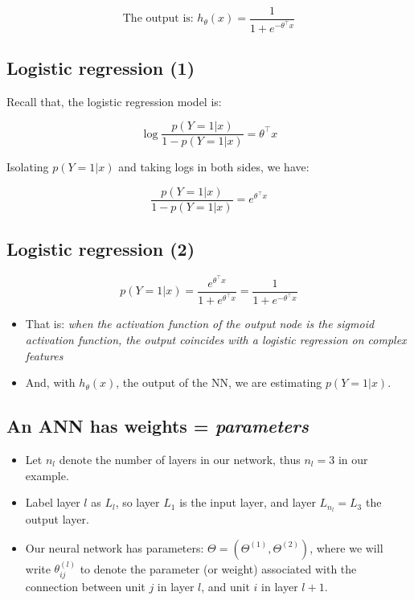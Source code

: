 \documentclass[
  letterpaper,
  DIV=11,
  numbers=noendperiod]{scrartcl}
\providecommand{\tightlist}{%
  \setlength{\itemsep}{0pt}\setlength{\parskip}{0pt}}\usepackage{longtable,booktabs,array}
\begin{document}
\[
\mbox{The output is: }h_{\theta}(x)=\frac{1}{1+e^{-\theta^\intercal x}}
\]

\hypertarget{logistic-regression-1}{%
\subsection{Logistic regression (1)}\label{logistic-regression-1}}

Recall that, the logistic regression model is:

\[
\log\frac{p(Y=1|x)}{1-p(Y=1|x)}=\theta^\intercal x
\]

Isolating \(p(Y=1|x)\) and taking logs in both sides, we have:

\[
\frac{p(Y=1|x)}{1-p(Y=1|x)}=e^{\theta^\intercal x}
\]

\hypertarget{logistic-regression-2}{%
\subsection{Logistic regression (2)}\label{logistic-regression-2}}

\[
p(Y=1|x)=\frac{e^{\theta^\intercal x}}{1+e^{\theta^\intercal x}}=\frac{1}{1+e^{-\theta^\intercal x}}
\]

\begin{itemize}
\item
  That is: \emph{when the activation function of the output node is the
  sigmoid activation function, the output coincides with a logistic
  regression on complex features}
\item
  And, with \(h_{\theta}(x)\), the output of the NN, we are estimating
  \(p(Y=1|x)\).
\end{itemize}

\hypertarget{an-ann-has-weights-parameters}{%
\subsection{\texorpdfstring{An ANN has weights =
\emph{parameters}}{An ANN has weights = parameters}}\label{an-ann-has-weights-parameters}}

\begin{itemize}
\tightlist
\item
  Let \(n_l\) denote the number of layers in our network, thus \(n_l=3\)
  in our example.
\item
  Label layer \(l\) as \(L_l\), so layer \(L_1\) is the input layer, and
  layer \(L_{n_l}=L_3\) the output layer.
\item
  Our neural network has parameters:
  \(\Theta=(\Theta^{(1)},\Theta^{(2)})\), where we will write
  \(\theta^{(l)}_{ij}\) to denote the parameter (or weight) associated
  with the connection between unit \(j\) in layer \(l\), and unit \(i\)
  in layer \(l+1\).
\end{itemize}
\end{document}
